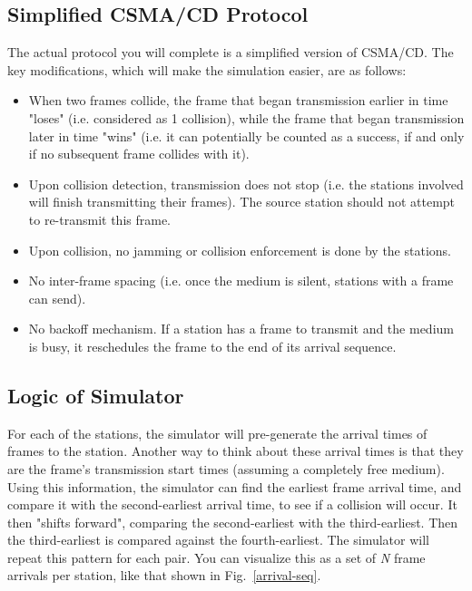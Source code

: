 \documentclass[11pt]{article}
\begin{document}
\subsection{Simplified CSMA/CD Protocol}
\label{subsec:simplified-csma-cd}
The actual protocol you will complete is a simplified version of CSMA/CD.
The key modifications, which will make the simulation easier, are as follows:
\begin{itemize}
    \item When two frames collide, the frame that began transmission earlier in time "loses" (i.e. considered as 1 collision), while the frame that began transmission later in time "wins" (i.e. it can potentially be counted as a success, if and only if no subsequent frame collides with it).
    \item Upon collision detection, transmission does not stop (i.e. the stations involved will finish transmitting their frames). The source station should not attempt to re-transmit this frame.
    \item Upon collision, no jamming or collision enforcement is done by the stations.
    \item No inter-frame spacing (i.e. once the medium is silent, stations with a frame can send).
    \item No backoff mechanism. If a station has a frame to transmit and the medium is busy, it reschedules the frame to the end of its arrival sequence.
\end{itemize}

\subsection{Logic of Simulator}
\label{subsec:logic}
For each of the stations, the simulator will pre-generate the arrival times of frames to the station.
Another way to think about these arrival times is that they are the frame's transmission start times (assuming a completely free medium).
Using this information, the simulator can find the earliest frame arrival time, and compare it with the second-earliest arrival time, to see if a collision will occur.
It then "shifts forward", comparing the second-earliest with the third-earliest.
Then the third-earliest is compared against the fourth-earliest.
The simulator will repeat this pattern for each pair.
You can visualize this as a set of \textit{N} frame arrivals per station, like that shown in Fig.~\ref{arrival-seq}.
\end{document}

